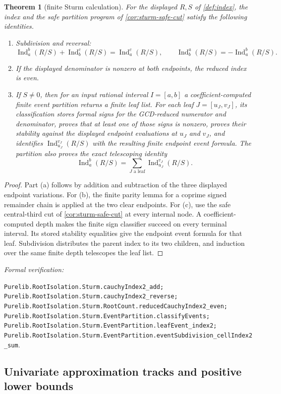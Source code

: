 \documentclass[11pt]{article}
\newtheorem{theorem}{Theorem}[section]
\newcommand{\Ind}{\operatorname{Ind}}
\newcommand{\leanref}[1]{\par\smallskip\noindent
  \emph{Formal verification:}\par\nobreak
  {\raggedright\nolinkurl{#1}.\par}}
\begin{document}
\begin{theorem}[finite Sturm calculation]
\label{thm:sturm}
For the displayed $R,S$ of \cref{def:index}, the index and the safe
partition program of \cref{cor:sturm-safe-cut} satisfy the following
identities.
\begin{enumerate}[label=(\alph*)]
\item Subdivision and reversal:
\[
 \Ind_a^b(R/S)+\Ind_b^c(R/S)=\Ind_a^c(R/S),\qquad
 \Ind_b^a(R/S)=-\Ind_a^b(R/S).
\]
\item If the displayed denominator is nonzero at both endpoints, the
reduced index is even.
\item If $S\ne0$, then for an input rational interval $I=[a,b]$ a
coefficient-computed finite event partition returns a finite leaf list.  For each leaf
$J=[u_J,v_J]$, its classification stores formal signs for
the GCD-reduced numerator and denominator, proves that at least one of those
signs is nonzero, proves their stability against the displayed endpoint
evaluations at $u_J$ and $v_J$, and identifies
$\Ind_{u_J}^{v_J}(R/S)$ with the resulting finite endpoint event formula.
The partition also proves the exact telescoping identity
\[
 \Ind_a^b(R/S)
 =\sum_{J\text{ a leaf}}\Ind_{u_J}^{v_J}(R/S).
\]
\end{enumerate}
\end{theorem}

\begin{proof}
Part (a) follows by addition and subtraction of the three displayed endpoint
variations.  For (b), the finite parity lemma for a coprime signed remainder
chain is applied at the two clear endpoints.  For (c), use the safe
central-third cut of \cref{cor:sturm-safe-cut} at every internal node.
A coefficient-computed depth makes the finite sign classifier succeed on
every terminal interval.  Its stored stability equalities give the endpoint
event formula for that leaf.  Subdivision distributes the parent index to
its two children, and induction over the same finite depth telescopes the
leaf list.
\end{proof}

\leanref{Purelib.RootIsolation.Sturm.cauchyIndex2_add; Purelib.RootIsolation.Sturm.cauchyIndex2_reverse;
Purelib.RootIsolation.Sturm.RootCount.reducedCauchyIndex2_even;
Purelib.RootIsolation.Sturm.EventPartition.classifyEvents;
Purelib.RootIsolation.Sturm.EventPartition.leafEvent_index2;
Purelib.RootIsolation.Sturm.EventPartition.eventSubdivision_cellIndex2_sum}

\subsection{Univariate approximation tracks and positive lower bounds}
\end{document}
